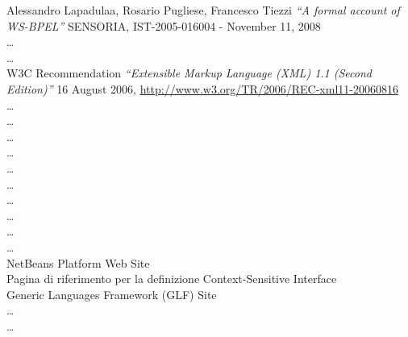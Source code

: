 \begin{thebibliography}{}

 Alessandro Lapadulaa, Rosario Pugliese, Francesco
Tiezzi \emph{``A formal account of WS-BPEL''} SENSORIA, IST-2005-016004
- November 11, 2008
\\

 \ldots
\\

 \ldots
\\

 W3C Recommendation \emph{``Extensible Markup Language (XML) 1.1
(Second Edition)''} 16 August 2006,
 \href{http://www.w3.org/TR/2006/REC-xml11-20060816}{http://www.w3.org/TR/2006/REC-xml11-20060816}
\\

 \ldots
\\

 \ldots
\\

 \ldots
\\

 \ldots
\\

 \ldots
\\

 \ldots
\\

 \ldots
\\

 \ldots
\\

 \ldots
\\


 \ldots
\\

 NetBeans Platform Web Site
\\

 Pagina di riferimento per la definizione
Context-Sensitive Interface
\\

 Generic Languages Framework (GLF) Site	
\\

 \ldots
\\

 \ldots
\\


\end{thebibliography}
